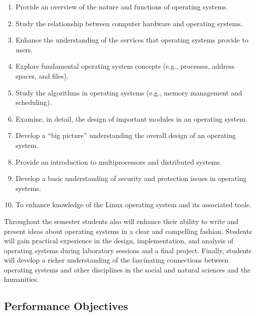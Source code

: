 \begin{enumerate}

  \itemsep -.05in

  \item Provide an overview of the nature and functions of operating systems.

  \item Study the relationship between computer hardware and operating systems.
  
  \item Enhance the understanding of the services that operating systems provide to users.

  \item Explore fundamental operating system concepts (e.g., processes, address spaces, and files). 

  \item Study the algorithms in operating systems (e.g., memory management and scheduling).

  \item Examine, in detail, the design of important modules in an operating system.

  \item Develop a ``big picture'' understanding the overall design of an operating system.

  \item Provide an introduction to multiprocessors and distributed systems.

  \item Develop a basic understanding of security and protection issues in operating systems.

  \item To enhance knowledge of the Linux operating system and its associated tools.

\end{enumerate}

\vspace*{-.2in} \noindent Throughout the semester students also will enhance their ability to write and present ideas
about operating systems in a clear and compelling fashion.  Students will gain practical experience in
the design, implementation, and analysis of operating systems during laboratory sessions and a final project. Finally,
students will develop a richer understanding of the fascinating connections between operating systems and other
disciplines in the social and natural sciences and the humanities.

\subsection*{Performance Objectives}

